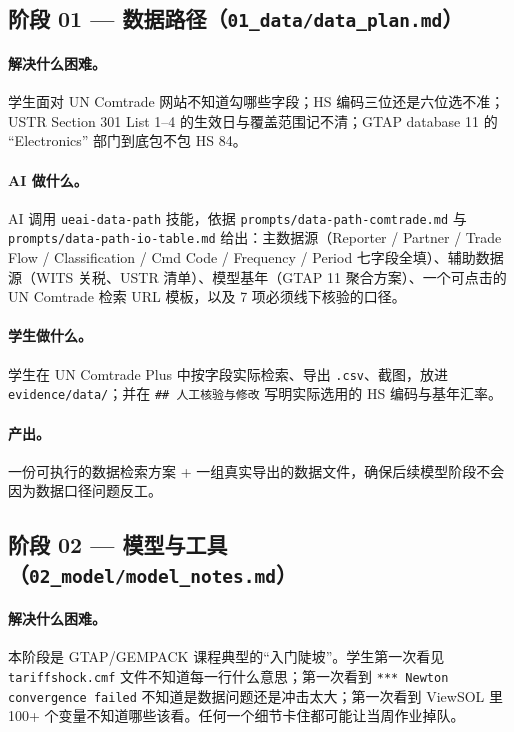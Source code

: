 \documentclass[12pt,a4paper]{article}
\begin{document}
\subsection{阶段 01 — 数据路径（\texttt{01\_data/data\_plan.md}）}

\paragraph{解决什么困难。}学生面对 UN Comtrade 网站不知道勾哪些字段；HS 编码三位还是六位选不准；USTR Section 301 List 1–4 的生效日与覆盖范围记不清；GTAP database 11 的 ``Electronics'' 部门到底包不包 HS 84。

\paragraph{AI 做什么。}AI 调用 \texttt{ueai-data-path} 技能，依据 \texttt{prompts/data-path-comtrade.md} 与 \texttt{prompts/data-path-io-table.md} 给出：主数据源（Reporter / Partner / Trade Flow / Classification / Cmd Code / Frequency / Period 七字段全填）、辅助数据源（WITS 关税、USTR 清单）、模型基年（GTAP 11 聚合方案）、一个可点击的 UN Comtrade 检索 URL 模板，以及 7 项必须线下核验的口径。

\paragraph{学生做什么。}学生在 UN Comtrade Plus 中按字段实际检索、导出 \texttt{.csv}、截图，放进 \texttt{evidence/data/}；并在 \texttt{\#\# 人工核验与修改} 写明实际选用的 HS 编码与基年汇率。

\paragraph{产出。}一份可执行的数据检索方案 + 一组真实导出的数据文件，确保后续模型阶段不会因为数据口径问题反工。

\subsection{阶段 02 — 模型与工具（\texttt{02\_model/model\_notes.md}）}

\paragraph{解决什么困难。}本阶段是 GTAP/GEMPACK 课程典型的``入门陡坡''。学生第一次看见 \texttt{tariffshock.cmf} 文件不知道每一行什么意思；第一次看到 \texttt{*** Newton convergence failed} 不知道是数据问题还是冲击太大；第一次看到 ViewSOL 里 100+ 个变量不知道哪些该看。任何一个细节卡住都可能让当周作业掉队。
\end{document}
